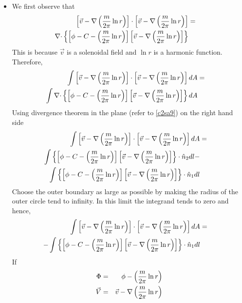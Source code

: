 \begin{itemize}
\item We first observe that
\begin{eqnarray*}
\left[\vec{v} - \operatorname{\nabla}\left(\frac{m}{2\pi}\ln r\right)\right]\cdot\left[\vec{v} - \operatorname{\nabla}\left(\frac{m}{2\pi}\ln r\right)\right] &=& \\ 
\operatorname{\nabla\cdot}\left\{\left[\phi - C - \left(\frac{m}{2\pi}\ln r\right)\right]\left[\vec{v} - \operatorname{\nabla}\left(\frac{m}{2\pi}\ln r\right)\right]\right\} & & 
\end{eqnarray*}
This is because $\vec{v}$ is a solenoidal field and $\ln r$ is a harmonic function. Therefore,
\begin{eqnarray*}
\int\left[\vec{v} - \operatorname{\nabla}\left(\frac{m}{2\pi}\ln r\right)\right]\cdot\left[\vec{v} - \operatorname{\nabla}\left(\frac{m}{2\pi}\ln r\right)\right]dA &=& \\ 
\int\operatorname{\nabla\cdot}\left\{\left[\phi - C - \left(\frac{m}{2\pi}\ln r\right)\right]\left[\vec{v} - \operatorname{\nabla}\left(\frac{m}{2\pi}\ln r\right)\right]\right\}dA & & 
\end{eqnarray*}
Using divergence theorem in the plane (refer to \ref{c2sa9}) on the right hand side
\begin{eqnarray*}
\int\left[\vec{v} - \operatorname{\nabla}\left(\frac{m}{2\pi}\ln r\right)\right]\cdot\left[\vec{v} - \operatorname{\nabla}\left(\frac{m}{2\pi}\ln r\right)\right]dA &=& \\ 
\int\left\{\left[\phi - C - \left(\frac{m}{2\pi}\ln r\right)\right]\left[\vec{v} - \operatorname{\nabla}\left(\frac{m}{2\pi}\ln r\right)\right]\right\}\cdot\hat{n}_2 dl - & & \\
\int\left\{\left[\phi - C - \left(\frac{m}{2\pi}\ln r\right)\right]\left[\vec{v} - \operatorname{\nabla}\left(\frac{m}{2\pi}\ln r\right)\right]\right\}\cdot\hat{n}_1 dl & & 
\end{eqnarray*}
Choose the outer boundary as large as possible by making the radius of the outer circle tend to infinity. In this limit the integrand tends to zero and hence,
\begin{eqnarray*}
\int\left[\vec{v} - \operatorname{\nabla}\left(\frac{m}{2\pi}\ln r\right)\right]\cdot\left[\vec{v} - \operatorname{\nabla}\left(\frac{m}{2\pi}\ln r\right)\right]dA &=& \\ 
-\int\left\{\left[\phi - C - \left(\frac{m}{2\pi}\ln r\right)\right]\left[\vec{v} - \operatorname{\nabla}\left(\frac{m}{2\pi}\ln r\right)\right]\right\}\cdot\hat{n}_1 dl & & 
\end{eqnarray*}
If
\begin{eqnarray*}
\Phi &=& \phi - \left(\frac{m}{2\pi}\ln r\right) \\
\vec{V} &=& \vec{v} - \operatorname{\nabla}\left(\frac{m}{2\pi}\ln r\right)
\end{eqnarray*}

\end{itemize}

